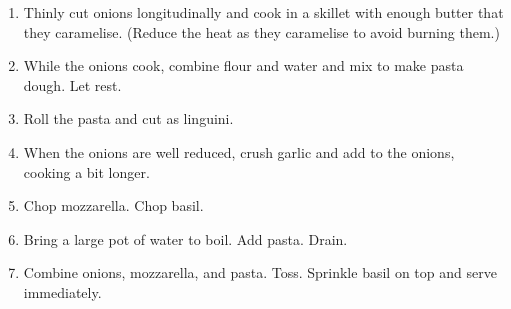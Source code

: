 
\begin{ingredients}
  \bigskip
  \bigskip
\end{ingredients}


\begin{recipe}
  \begin{enumerate}

  \item Thinly cut onions longitudinally and cook in a skillet with
    enough butter that they caramelise.  (Reduce the heat as they
    caramelise to avoid burning them.)

  \item While the onions cook, combine flour and water and mix to make
    pasta dough.  Let rest.

  \item Roll the pasta and cut as linguini.

  \item When the onions are well reduced, crush garlic and add to the
    onions, cooking a bit longer.

  \item Chop mozzarella.  Chop basil.

  \item Bring a large pot of water to boil.  Add pasta.  Drain.

  \item Combine onions, mozzarella, and pasta.  Toss.  Sprinkle basil
    on top and serve immediately.
    
  \end{enumerate}
\end{recipe}

